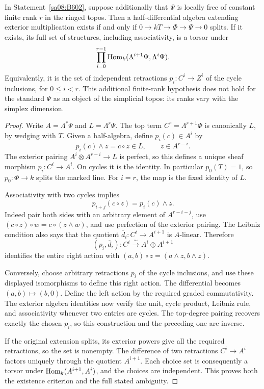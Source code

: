 \begin{theorem}\label{sa08:B605}
In Statement~\ref{sa08:B602}, suppose additionally that $\Psi$ is
locally free of constant finite rank $r$ in the ringed topos.
Then a half-differential algebra extending exterior multiplication
exists if and only if $0\to kT\to\Phi\to\Psi\to0$ splits.
If it exists, its full set of structures, including associativity,
is a torsor under
\[
 \prod_{i=0}^{r-1}
 \operatorname{Hom}_k(\Lambda^{i+1}\Psi,\Lambda^i\Psi).
\]
Equivalently, it is the set of independent retractions
$p_i:C^i\to Z^i$ of the cycle inclusions, for $0\le i<r$.
This additional finite-rank hypothesis does not hold for the
standard $\Psi$ as an object of the simplicial topos: its ranks
vary with the simplex dimension.
\end{theorem}
\begin{proof}
Write $A=\Lambda^*\Psi$ and $L=\Lambda^r\Psi$. The top term
$C^r=\Lambda^{r+1}\Phi$ is canonically $L$, by wedging with $T$.
Given a half-algebra, define $p_i(c)\in A^i$ by
\[
 p_i(c)\wedge z=c\circ z\in L,
 \qquad z\in A^{r-i}.
\]
The exterior pairing $A^i\otimes A^{r-i}\to L$ is perfect, so
this defines a unique sheaf morphism $p_i:C^i\to A^i$.
On cycles it is the identity. In particular $p_0(T)=1$, so
$p_0:\Phi\to k$ splits the marked line. For $i=r$, the map is
the fixed identity of $L$.

Associativity with two cycles implies
\[
 p_{i+j}(c\circ z)=p_i(c)\wedge z.
\]
Indeed pair both sides with an arbitrary element of $A^{r-i-j}$,
use $(c\circ z)\circ w=c\circ(z\wedge w)$, and use perfection
of the exterior pairing. The Leibniz condition also says that the
quotient $\overline d_i:C^i\to A^{i+1}$ is $A$-linear. Therefore
\[
 (p_i,\overline d_i):C^i\xrightarrow{\sim}
 A^i\oplus A^{i+1}
\]
identifies the entire right action with
$(a,b)\circ z=(a\wedge z,b\wedge z)$.

Conversely, choose arbitrary retractions $p_i$ of the cycle
inclusions, and use these displayed isomorphisms to define this
right action. The differential becomes $(a,b)\mapsto(b,0)$.
Define the left action by the required graded commutativity.
The exterior algebra identities now verify the unit, cycle product,
Leibniz rule, and associativity whenever two entries are cycles.
The top-degree pairing recovers exactly the chosen $p_i$, so this
construction and the preceding one are inverse.

If the original extension splits, its exterior powers give all
the required retractions, so the set is nonempty. The difference
of two retractions $C^i\to A^i$ factors uniquely through the
quotient $A^{i+1}$. Each choice set is consequently a torsor under
$\operatorname{Hom}_k(A^{i+1},A^i)$, and the choices are independent. This
proves both the existence criterion and the full stated ambiguity.
\end{proof}

